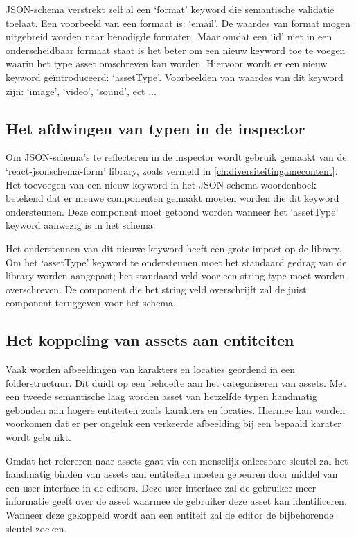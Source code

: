 JSON-schema verstrekt zelf al een ‘format’ keyword die semantische validatie toelaat. Een voorbeeld van een formaat is: ‘email’\cite{Droettboom2016}. De waardes van format mogen uitgebreid worden naar benodigde formaten. Maar omdat een ‘id’ niet in een onderscheidbaar formaat staat is het beter om een nieuw keyword toe te voegen waarin het type asset omschreven kan worden. Hiervoor wordt er een nieuw keyword geïntroduceerd: ‘assetType’. Voorbeelden van waardes van dit keyword zijn: ‘image’, ‘video’, ‘sound’, ect ...

\subsection{Het afdwingen van typen in de inspector}
Om JSON-schema’s te reflecteren in de inspector wordt gebruik gemaakt van de ‘react-jsonschema-form’ library, zoals vermeld in \autoref{ch:diversiteitingamecontent}. Het toevoegen van een nieuw keyword in het JSON-schema woordenboek betekend dat er nieuwe componenten gemaakt moeten worden die dit keyword ondersteunen. Deze component moet getoond worden wanneer het ‘assetType’ keyword aanwezig is in het schema.

Het ondersteunen van dit nieuwe keyword heeft een grote impact op de library. Om het ‘assetType’ keyword te ondersteunen moet het standaard gedrag van de library worden aangepast; het standaard veld voor een string type moet worden overschreven. De component die het string veld overschrijft zal de juist component teruggeven voor het schema.

\pagebreak

\subsection{Het koppeling van assets aan entiteiten}
Vaak worden afbeeldingen van karakters en locaties geordend in een folderstructuur. Dit duidt op een behoefte aan het categoriseren van assets. Met een tweede semantische laag worden asset van hetzelfde typen handmatig gebonden aan hogere entiteiten zoals karakters en locaties. Hiermee kan worden voorkomen dat er per ongeluk een verkeerde afbeelding bij een bepaald karater wordt gebruikt.

Omdat het refereren naar assets gaat via een menselijk onleesbare sleutel zal het handmatig binden van assets aan entiteiten moeten gebeuren door middel van een user interface in de editors. Deze user interface zal de gebruiker meer informatie geeft over de asset waarmee de gebruiker deze asset kan identificeren. Wanneer deze gekoppeld wordt aan een entiteit zal de editor de bijbehorende sleutel zoeken.


